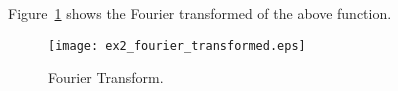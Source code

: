
\item [b)]
Figure~\ref{fig:FourierTransform} shows the Fourier transformed of the above function. \\
\begin{figure}[!ht]
	\centering
	\texttt{[image: ex2\_fourier\_transformed.eps]}
	\vspace{-0.3cm}
	\caption{Fourier Transform.}
	\label{fig:FourierTransform}
	\vspace{-0.1cm}
\end{figure}
